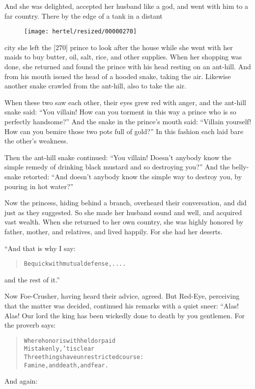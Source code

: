 \documentclass[article, twoside, 10pt]{memoir}
\renewenvironment{verbatim}{%
\begin{quote}%
\vskip -10pt%
\begin{alltt}\normalfont\small}{\end{alltt}%
\end{quote}%
\vskip -10pt
} %
\begin{document}
And she was delighted, accepted her husband like a god, and went
with him to a far country. There by the edge of a tank in a distant
\begin{figure}[p]\texttt{[image: hertel/resized/00000270]}\end{figure}city she left the [270] prince to look after the house while she
went with her maids to buy butter, oil, salt, rice, and other
supplies. When her shopping was done, she returned and found the
prince with his head resting on an ant-hill. And from his mouth
issued the head of a hooded snake, taking the air. Likewise another
snake crawled from the ant-hill, also to take the air.

When these two saw each other, their eyes grew red with anger, and
the ant-hill snake said:
``You villain! How can you torment in this way a prince who is so perfectly handsome?''
And the snake in the prince's mouth said:
``Villain yourself! How can you bemire those two pots full of gold?''
In this fashion each laid bare the other's weakness.

Then the ant-hill snake continued:
``You villain! Doesn't anybody know the simple remedy of drinking black mustard and so destroying you?''
And the belly-snake retorted:
``And doesn't anybody know the simple way to destroy you, by pouring in hot water?''

Now the princess, hiding behind a branch, overheard their
conversation, and did just as they suggested. So she made her
husband sound and well, and acquired vast wealth. When she returned
to her own country, she was highly honored by father, mother, and
relatives, and lived happily. For she had her deserts.

“And that is why I say:

\begin{verbatim}
Be quick with mutual defense, ....
\end{verbatim}
and the rest of it.”

Now Foe-Crusher, having heard their advice, agreed. But Red-Eye,
perceiving that the matter was decided, continued his remarks with
a quiet sneer: “Alas! Alas! Our lord the king has been wickedly
done to death by you gentlemen. For the proverb says:

\begin{verbatim}
Where honor is withheld or paid
    Mistakenly, 'tis clear
Three things have unrestricted course:
    Famine, and death, and fear.
\end{verbatim}
And again:
\end{document}
